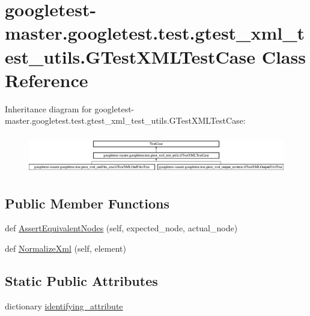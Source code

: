 \hypertarget{classgoogletest-master_1_1googletest_1_1test_1_1gtest__xml__test__utils_1_1_g_test_x_m_l_test_case}{}\section{googletest-\/master.googletest.\+test.\+gtest\+\_\+xml\+\_\+test\+\_\+utils.\+G\+Test\+X\+M\+L\+Test\+Case Class Reference}
\label{classgoogletest-master_1_1googletest_1_1test_1_1gtest__xml__test__utils_1_1_g_test_x_m_l_test_case}
Inheritance diagram for googletest-\/master.googletest.\+test.\+gtest\+\_\+xml\+\_\+test\+\_\+utils.\+G\+Test\+X\+M\+L\+Test\+Case\+:\begin{figure}[H]
\begin{center}
\leavevmode
\includegraphics[height=1.710794cm]{dc/dcf/classgoogletest-master_1_1googletest_1_1test_1_1gtest__xml__test__utils_1_1_g_test_x_m_l_test_case}
\end{center}
\end{figure}
\subsection*{Public Member Functions}
\begin{DoxyCompactItemize}
\item 
def \mbox{\hyperlink{classgoogletest-master_1_1googletest_1_1test_1_1gtest__xml__test__utils_1_1_g_test_x_m_l_test_case_a393b1518e95e01d508c25850ad0bc0f2}{Assert\+Equivalent\+Nodes}} (self, expected\+\_\+node, actual\+\_\+node)
\item 
def \mbox{\hyperlink{classgoogletest-master_1_1googletest_1_1test_1_1gtest__xml__test__utils_1_1_g_test_x_m_l_test_case_aeaf548d597d53c5bf3fc123da7ba789e}{Normalize\+Xml}} (self, element)
\end{DoxyCompactItemize}
\subsection*{Static Public Attributes}
\begin{DoxyCompactItemize}
\item 
dictionary \mbox{\hyperlink{classgoogletest-master_1_1googletest_1_1test_1_1gtest__xml__test__utils_1_1_g_test_x_m_l_test_case_a819d2d5213bad859c7fc9600d561b708}{identifying\+\_\+attribute}}
\end{DoxyCompactItemize}
